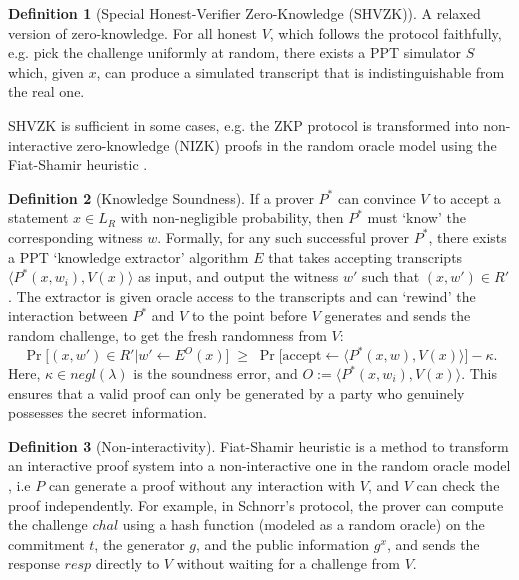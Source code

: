\documentclass[12pt]{article}
\theoremstyle{definition}
\newtheorem{definition}{Definition}[section]
\begin{document}
\begin{definition}[Special Honest-Verifier Zero-Knowledge (SHVZK)]
A relaxed version of zero-knowledge. For all honest $V$, which follows the protocol faithfully, e.g. pick the challenge uniformly at random, there exists a PPT simulator $S$ which, given $x$, can produce a simulated transcript that is indistinguishable from the real one.

SHVZK is sufficient in some cases, e.g. the ZKP protocol is transformed into non-interactive zero-knowledge (NIZK) proofs in the random oracle model \cite{RO} using the Fiat-Shamir heuristic \cite{FS}.
\end{definition}

\begin{definition}[Knowledge Soundness] If a prover \(P^*\) can convince $V$ to accept a statement \(x \in L_R\) with non-negligible probability, then \(P^*\) must `know' the corresponding witness \(w\). Formally, for any such successful prover \(P^*\), there exists a PPT `knowledge extractor' algorithm \(E\) that takes accepting transcripts $\langle P^*(x,w_i),V(x)\rangle$ as input, and output the witness \(w'\) such that \((x,w') \in R'\). The extractor is given oracle access to the transcripts and can `rewind' the interaction between $P^*$ and $V$ to the point before $V$ generates and sends the random challenge, to get the fresh randomness from $V$:
  \[
  \Pr\bigl[(x,w') \in R'| w' \leftarrow E^O(x)\bigr]
  \;\ge\; \Pr\bigl[\text{accept} \leftarrow \langle P^*(x,w), V(x)\rangle\bigr] - \kappa.
  \]
  Here, \(\kappa \in negl(\lambda)\) is the soundness error, and $O:=\langle P^*(x,w_i),V(x)\rangle$. This ensures that a valid proof can only be generated by a party who genuinely possesses the secret information.
\end{definition}

\begin{definition}[Non-interactivity] Fiat-Shamir heuristic \cite{FS} is a method to transform an interactive proof system into a non-interactive one in the random oracle model \cite{RO}, i.e $P$ can generate a proof without any interaction with $V$, and $V$ can check the proof independently. For example, in Schnorr's protocol, the prover can compute the challenge $chal$ using a hash function (modeled as a random oracle) on the commitment $t$, the generator $g$, and the public information $g^x$, and sends the response $resp$ directly to $V$ without waiting for a challenge from $V$.
\end{definition}
\end{document}
